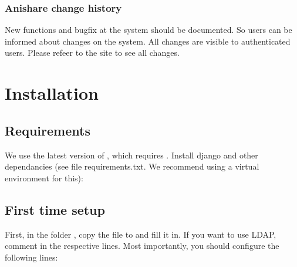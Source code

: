 \documentclass[letterpaper,10pt,openany,oneside,english]{sphinxmanual}
\begin{document}
\noindent{}


\subsection{Anishare change history}
\label{\detokenize{index:anishare-change-history}}
New functions and bugfix at the system should be documented. So users can be informed about changes on the system.
All changes are visible to authenticated users. Please refeer to the site  to see all changes.


\chapter{Installation}
\label{\detokenize{index:installation}}

\section{Requirements}
\label{\detokenize{index:requirements}}
We use the latest version of , which requires .
Install django and other dependancies (see file requirements.txt. We recommend using a virtual environment for this):

%
\begin{sphinxVerbatim}[commandchars=\\\{\}]
   
 
   
\end{sphinxVerbatim}


\section{First time setup}
\label{\detokenize{index:first-time-setup}}
First, in the folder , copy the file 
to  and fill it in. If you want to use LDAP, comment in
the respective lines. Most importantly, you should configure the following lines:

%
\begin{sphinxVerbatim}[commandchars=\\\{\}]
  
  
  \PYG{p}{[} \PYG{p}{]}
\end{sphinxVerbatim}
\end{document}
